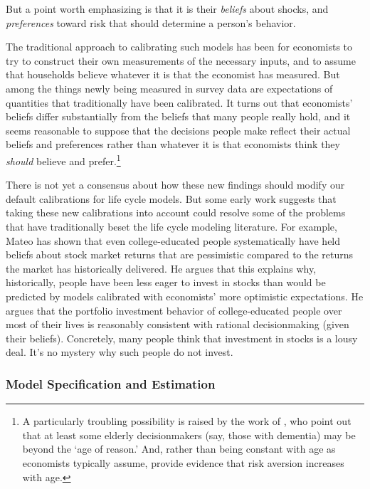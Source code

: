 \documentclass{article}
\begin{document}
But a point worth emphasizing is that it is their \textit{beliefs} about shocks, and \textit{preferences} toward risk that should determine a person's behavior.

The traditional approach to calibrating such models has been for economists to try to construct their own measurements of the necessary inputs, and to assume that households believe whatever it is that the economist has measured. But among the things newly being measured in survey data are expectations of quantities that traditionally have been calibrated. It turns out that economists' beliefs differ substantially from the beliefs that many people really hold, and it seems reasonable to suppose that the decisions people make reflect their actual beliefs and preferences rather than whatever it is that economists think they \textit{should} believe and prefer.\footnote{A particularly troubling possibility is raised by the work of \cite{gabaix2010age}, who point out that at least some elderly decisionmakers (say, those with dementia) may be beyond the `age of reason.' And, rather than being constant with age as economists typically assume, \cite{albert2012differences} provide evidence that risk aversion increases with age.}

There is not yet a consensus about how these new findings should modify our default calibrations for life cycle models. But some early work suggests that taking these new calibrations into account could resolve some of the problems that have traditionally beset the life cycle modeling literature. For example, Mateo \cite{velasquezgiraldoJMP} has shown that even college-educated people systematically have held beliefs about stock market returns that are pessimistic compared to the returns the market has historically delivered. He argues that this explains why, historically, people have been less eager to invest in stocks than would be predicted by models calibrated with economists' more optimistic expectations. He argues that the portfolio investment behavior of college-educated people over most of their lives is reasonably consistent with rational decisionmaking (given their beliefs).  Concretely, many people think that investment in stocks is a lousy deal.  It's no mystery why such people do not invest.

\subsubsection{Model Specification and Estimation}
\end{document}
